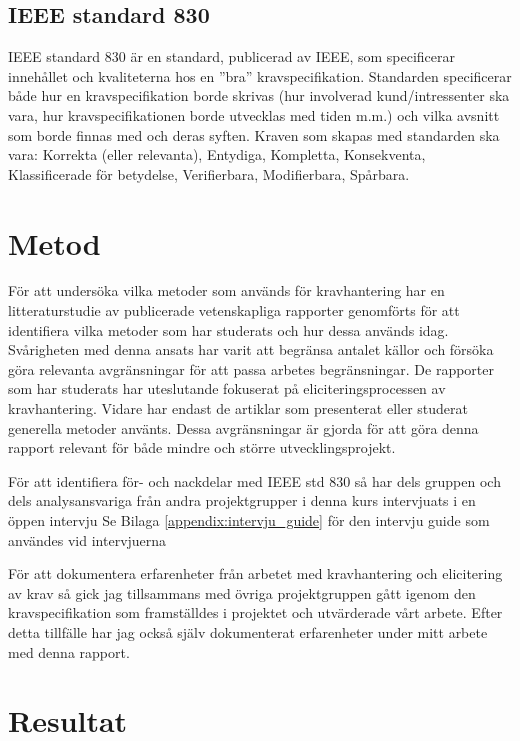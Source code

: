 \subsection{IEEE standard 830}
IEEE standard 830 är en standard, publicerad av IEEE, som specificerar innehållet och kvaliteterna hos en ”bra” kravspecifikation.\cite{ieee1998ieee} Standarden specificerar både hur en kravspecifikation borde skrivas (hur involverad kund/intressenter ska vara, hur kravspecifikationen borde utvecklas med tiden m.m.) och vilka avsnitt som borde finnas med och deras syften. Kraven som skapas med standarden ska vara: Korrekta (eller relevanta), Entydiga, Kompletta, Konsekventa, Klassificerade för betydelse, Verifierbara, Modifierbara, Spårbara.

\section{Metod}
\label{sec:method-jannering}

För att undersöka vilka metoder som används för kravhantering har en litteraturstudie av publicerade vetenskapliga rapporter genomförts för att identifiera vilka metoder som har studerats och hur dessa används idag. Svårigheten med denna ansats har varit att begränsa antalet källor och försöka göra relevanta avgränsningar för att passa arbetes begränsningar. De rapporter som har studerats har uteslutande fokuserat på eliciteringsprocessen av kravhantering. Vidare har endast de artiklar som presenterat eller studerat generella metoder använts. Dessa avgränsningar är gjorda för att göra denna rapport relevant för både mindre och större utvecklingsprojekt.
  
För att identifiera för- och nackdelar med IEEE std 830 \cite{ieee1998ieee} så har dels gruppen och dels analysansvariga från andra projektgrupper i denna kurs intervjuats i en öppen intervju Se Bilaga \ref{appendix:intervju_guide} för den intervju guide som användes vid intervjuerna

För att dokumentera erfarenheter från arbetet med kravhantering och elicitering av krav så gick jag tillsammans med övriga projektgruppen gått igenom den kravspecifikation som framställdes i projektet och utvärderade vårt arbete. Efter detta tillfälle har jag också själv dokumenterat erfarenheter under mitt arbete med denna rapport.




\section{Resultat}
\label{sec:results-jannering}
